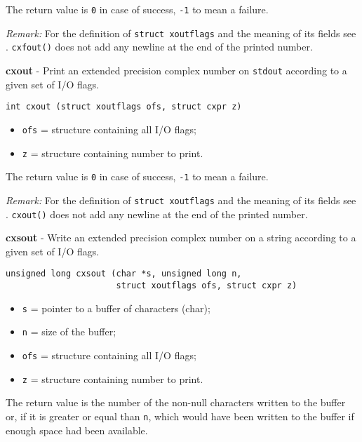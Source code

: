 \documentclass{article}
\begin{document}
The return value is \texttt{0} in case of success, 
\texttt{-1} to mean a failure.

\textit{Remark:} 
For the definition of \texttt{struct xoutflags} and the meaning 
of its fields see . 
\texttt{cxfout()} does not add any newline 
at the end of the printed number.


\hrulefill{}

\textbf{cxout} - Print an extended precision complex number on \texttt{stdout} 
according to a given set of I/O flags.

\begin{verbatim}
int cxout (struct xoutflags ofs, struct cxpr z)
\end{verbatim}

\begin{itemize}
\item \texttt{ofs} = structure containing all I/O flags;
\item \texttt{z}   = structure containing number to print.
\end{itemize}

The return value is \texttt{0} in case of success, \texttt{-1} to mean a failure.

\textit{Remark:} 
For the definition of \texttt{struct xoutflags} and the meaning 
of its fields see .
\texttt{cxout()} does not add any newline 
at the end of the printed number.


\hrulefill{}

\textbf{cxsout} - Write an extended precision complex number on a string
according to a given set of I/O flags.

\begin{verbatim}
unsigned long cxsout (char *s, unsigned long n,
                      struct xoutflags ofs, struct cxpr z)
\end{verbatim}

\begin{itemize}
\item \texttt{s}   = pointer to a buffer of characters (char);
\item \texttt{n}   = size of the buffer;
\item \texttt{ofs} = structure containing all I/O flags;
\item \texttt{z}   = structure containing number to print.
\end{itemize}

The return value is the number of the non-null characters written
to the buffer or, if it is greater or equal than \texttt{n}, which would have been 
written to the buffer if enough space had been available.
\end{document}

